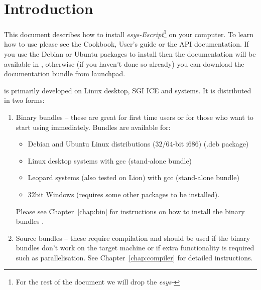%
%
%

\chapter{Introduction}
This document describes how to install \emph{esys-Escript}\footnote{For the rest of the document we will drop the \emph{esys-}} on your computer.
To learn how to use \esfinley please see the Cookbook, User's guide or the API documentation.
If you use the Debian or Ubuntu packages to install then the documentation will be available in
, otherwise (if you haven't done so already) you can download the documentation bundle 
from launchpad.

\esfinley is primarily developed on Linux desktop, SGI ICE and \macosx systems.
It is distributed in two forms:
\begin{enumerate}
  \item Binary bundles -- these are great for first time users or for those who want to start using 
    \esfinley immediately.
      Bundles are available for:
      \begin{itemize}
	  \item Debian and Ubuntu Linux distributions ($32$/$64$-bit i686) (.deb package)
	  \item Linux desktop systems with gcc (stand-alone bundle)
	  \item \macosx Leopard systems (also tested on Lion) with gcc (stand-alone bundle)
	  \item $32$bit Windows (requires some other packages to be installed).
      \end{itemize}    
    Please see Chapter~\ref{chap:bin} for instructions on how to install the binary bundles \esfinley.
  \item Source bundles -- these require compilation and should be used if the binary bundles 
    don't work on the target machine or if extra functionality is required such as \mpi parallelisation.
    See Chapter~\ref{chap:compiler} for detailed instructions.
\end{enumerate}

